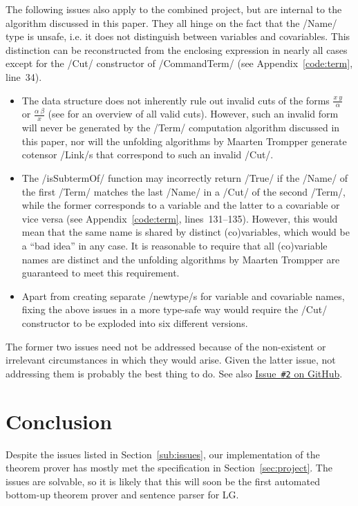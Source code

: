 \documentclass[12pt,a4paper]{article}
\begin{document}
The following issues also apply to the combined project, but are internal to the algorithm discussed in this paper. They all hinge on the fact that the \hs/Name/ type is unsafe, i.e. it does not distinguish between variables and covariables. This distinction can be reconstructed from the enclosing expression in nearly all cases except for the \hs/Cut/ constructor of \hs/CommandTerm/ (see Appendix~\ref{code:term}, line~34).
\begin{itemize}
    \item The data structure does not inherently rule out invalid cuts of the forms $\frac{x\ y}{\alpha}$ or $\frac{\alpha\ \beta}{x}$ (see \cite[p.~24]{mm12} for an overview of all valid cuts). However, such an invalid form will never be generated by the \hs/Term/ computation algorithm discussed in this paper, nor will the unfolding algorithms by Maarten Trompper generate cotensor \hs/Link/s that correspond to such an invalid \hs/Cut/.
    \item The \hs/isSubtermOf/ function may incorrectly return \hs/True/ if the \hs/Name/ of the first \hs/Term/ matches the last \hs/Name/ in a \hs/Cut/ of the second \hs/Term/, while the former corresponds to a variable and the latter to a covariable or vice versa (see Appendix~\ref{code:term}, lines~131--135). However, this would mean that the same name is shared by distinct (co)variables, which would be a ``bad idea'' in any case. It is reasonable to require that all (co)variable names are distinct and the unfolding algorithms by Maarten Trompper are guaranteed to meet this requirement.
    \item Apart from creating separate \hs/newtype/s for variable and covariable names, fixing the above issues in a more type-safe way would require the \hs/Cut/ constructor to be exploded into six different versions.
\end{itemize}
The former two issues need not be addressed because of the non-existent or irrelevant circumstances in which they would arise. Given the latter issue, not addressing them is probably the best thing to do. See also \href{https://github.com/jgonggrijp/net-prove/issues/2}{Issue~\texttt{\#2} on GitHub}.


\section{Conclusion}

Despite the issues listed in Section~\ref{sub:issues}, our implementation of the theorem prover has mostly met the specification in Section~\ref{sec:project}. The issues are solvable, so it is likely that this will soon be the first automated bottom-up theorem prover and sentence parser for LG.
\end{document}
